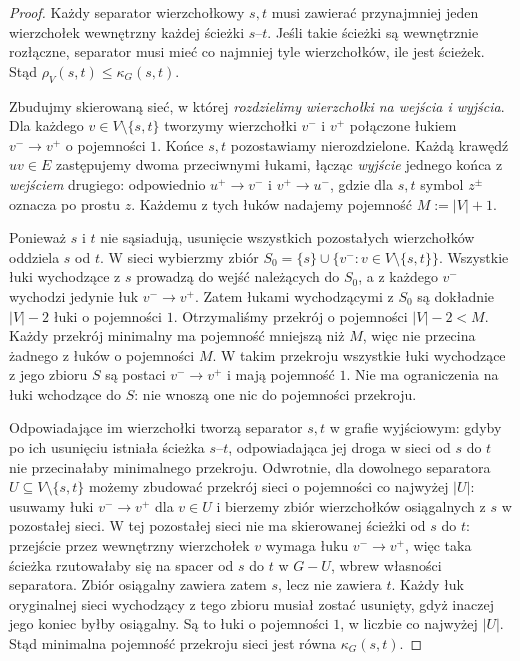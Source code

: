 \begin{proof}
Każdy separator wierzchołkowy $s,t$ musi zawierać
przynajmniej jeden wierzchołek wewnętrzny każdej
ścieżki $s$--$t$. Jeśli takie ścieżki są wewnętrznie
rozłączne, separator musi mieć co najmniej tyle
wierzchołków, ile jest ścieżek. Stąd
$\rho_V(s,t)\le\kappa_G(s,t)$.

Zbudujmy skierowaną sieć, w której \emph{rozdzielimy
wierzchołki na wejścia i wyjścia}. Dla każdego
$v\in V\setminus\{s,t\}$ tworzymy wierzchołki
$v^-$ i $v^+$ połączone łukiem $v^-\to v^+$
o pojemności $1$. Końce $s,t$ pozostawiamy
nierozdzielone. Każdą krawędź $uv\in E$
zastępujemy dwoma przeciwnymi łukami,
łącząc \emph{wyjście} jednego końca z \emph{wejściem}
drugiego: odpowiednio $u^+\to v^-$ i $v^+\to u^-$,
gdzie dla $s,t$ symbol $z^\pm$ oznacza po prostu $z$.
Każdemu z tych łuków nadajemy pojemność
$M:=|V|+1$.

Ponieważ $s$ i $t$ nie sąsiadują, usunięcie wszystkich
pozostałych wierzchołków oddziela $s$ od $t$.
W sieci wybierzmy zbiór
$S_0=\{s\}\cup\{v^-:v\in V\setminus\{s,t\}\}$.
Wszystkie łuki wychodzące z $s$ prowadzą do wejść
należących do $S_0$, a z każdego $v^-$ wychodzi
jedynie łuk $v^-\to v^+$.
Zatem łukami wychodzącymi z $S_0$ są dokładnie
$|V|-2$ łuki o pojemności $1$. Otrzymaliśmy
przekrój o pojemności $|V|-2<M$.
Każdy przekrój minimalny ma pojemność mniejszą niż $M$,
więc nie przecina żadnego z łuków o pojemności $M$.
W takim przekroju wszystkie łuki wychodzące
z jego zbioru $S$ są postaci $v^-\to v^+$
i mają pojemność $1$. Nie ma ograniczenia
na łuki wchodzące do $S$: nie wnoszą one
nic do pojemności przekroju.

Odpowiadające im wierzchołki tworzą separator
$s,t$ w grafie wyjściowym: gdyby po ich usunięciu
istniała ścieżka $s$--$t$, odpowiadająca jej droga
w sieci od $s$ do $t$ nie przecinałaby minimalnego
przekroju. Odwrotnie, dla dowolnego separatora
$U\subseteq V\setminus\{s,t\}$ możemy zbudować
przekrój sieci o pojemności co najwyżej $|U|$:
usuwamy łuki $v^-\to v^+$ dla $v\in U$ i bierzemy
zbiór wierzchołków osiągalnych z $s$ w pozostałej
sieci. W tej pozostałej sieci nie ma skierowanej
ścieżki od $s$ do $t$: przejście przez wewnętrzny
wierzchołek $v$ wymaga łuku $v^-\to v^+$,
więc taka ścieżka rzutowałaby się na spacer od $s$ do $t$
w $G-U$, wbrew własności separatora.
Zbiór osiągalny zawiera zatem $s$, lecz nie zawiera $t$.
Każdy łuk oryginalnej sieci wychodzący z tego zbioru
musiał zostać usunięty, gdyż inaczej jego koniec
byłby osiągalny. Są to łuki o pojemności $1$,
w liczbie co najwyżej $|U|$.
Stąd minimalna pojemność przekroju sieci jest
równa $\kappa_G(s,t)$.


\end{proof}
